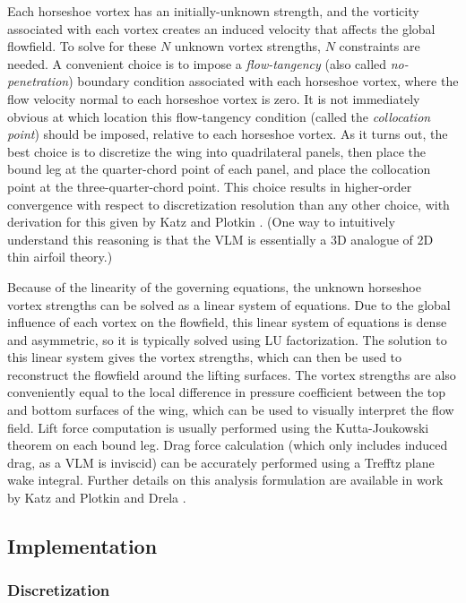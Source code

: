 Each horseshoe vortex has an initially-unknown strength, and the vorticity associated with each vortex creates an induced velocity that affects the global flowfield. To solve for these $N$ unknown vortex strengths, $N$ constraints are needed. A convenient choice is to impose a \emph{flow-tangency} (also called \emph{no-penetration}) boundary condition associated with each horseshoe vortex, where the flow velocity normal to each horseshoe vortex is zero. It is not immediately obvious at which location this flow-tangency condition (called the \emph{collocation point}) should be imposed, relative to each horseshoe vortex. As it turns out, the best choice is to discretize the wing into quadrilateral panels, then place the bound leg at the quarter-chord point of each panel, and place the collocation point at the three-quarter-chord point. This choice results in higher-order convergence with respect to discretization resolution than any other choice, with derivation for this given by Katz and Plotkin \cite{katz_lowspeed_2004}. (One way to intuitively understand this reasoning is that the VLM is essentially a 3D analogue of 2D thin airfoil theory.)

Because of the linearity of the governing equations, the unknown horseshoe vortex strengths can be solved as a linear system of equations. Due to the global influence of each vortex on the flowfield, this linear system of equations is dense and asymmetric, so it is typically solved using LU factorization. The solution to this linear system gives the vortex strengths, which can then be used to reconstruct the flowfield around the lifting surfaces. The vortex strengths are also conveniently equal to the local difference in pressure coefficient between the top and bottom surfaces of the wing, which can be used to visually interpret the flow field. Lift force computation is usually performed using the Kutta-Joukowski theorem on each bound leg. Drag force calculation (which only includes induced drag, as a VLM is inviscid) can be accurately performed using a Trefftz plane wake integral. Further details on this analysis formulation are available in work by Katz and Plotkin \cite{katz_lowspeed_2004} and Drela \cite{drela_flight_2013}.

\subsection{Implementation}

\subsubsection{Discretization}
\label{sec:geometry_stack}

